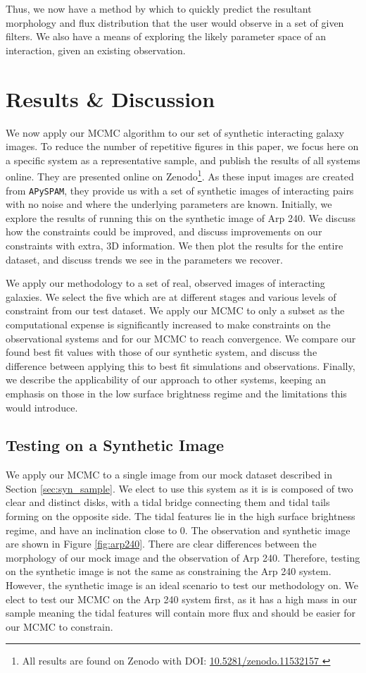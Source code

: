 Thus, we now have a method by which to quickly predict the resultant morphology and flux distribution that the user would observe in a set of given filters. We also have a means of exploring the likely parameter space of an interaction, given an existing observation.


\section{Results \& Discussion}\label{Results}
	\noindent We now apply our MCMC algorithm to our set of synthetic interacting galaxy images. To reduce the number of repetitive figures in this paper, we focus here on a specific system as a representative sample, and publish the results of all systems online. They are presented online on Zenodo\footnote{All results are found on Zenodo with DOI: \href{https://doi.org/10.5281/zenodo.11532157
}{10.5281/zenodo.11532157
}}. As these input images are created from \texttt{APySPAM}, they provide us with a set of synthetic images of interacting pairs with no noise and where the underlying parameters are known. Initially, we explore the results of running this on the synthetic image of Arp 240. We discuss how the constraints could be improved, and discuss improvements on our constraints with extra, 3D information. We then plot the results for the entire dataset, and discuss trends we see in the parameters we recover.

We apply our methodology to a set of real, observed images of interacting galaxies. We select the five which are at different stages and various levels of constraint from our test dataset. We apply our MCMC to only a subset as the computational expense is significantly increased to make constraints on the observational systems and for our MCMC to reach convergence. We compare our found best fit values with those of our synthetic system, and discuss the difference between applying this to best fit simulations and observations. Finally, we describe the applicability of our approach to other systems, keeping an emphasis on those in the low surface brightness regime and the limitations this would introduce.

\subsection{Testing on a Synthetic Image}
We apply our MCMC to a single image from our mock dataset described in Section \ref{sec:syn_sample}. We elect to use this system as it is is composed of two clear and distinct disks, with a tidal bridge connecting them and tidal tails forming on the opposite side. The tidal features lie in the high surface brightness regime, and have an inclination close to 0. The observation and synthetic image are shown in Figure \ref{fig:arp240}. There are clear differences between the morphology of our mock image and the observation of Arp 240. Therefore, testing on the synthetic image is not the same as constraining the Arp 240 system. However, the synthetic image is an ideal scenario to test our methodology on. We elect to test our MCMC on the Arp 240 system first, as it has a high mass in our sample meaning the tidal features will contain more flux and should be easier for our MCMC to constrain.

